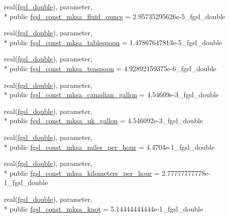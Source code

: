 \begin{DoxyCompactItemize}
\item 
real(\hyperlink{classfgsl_a9af5113378e0f000eb479d3f90196ddf}{fgsl\-\_\-double}), parameter, \\*
public \hyperlink{classfgsl_af688bbef5ebab7dfd674fad9cf5d8bd3}{fgsl\-\_\-const\-\_\-mksa\-\_\-fluid\-\_\-ounce} = 2.\-95735295626e-\/5\-\_\-fgsl\-\_\-double
\item 
real(\hyperlink{classfgsl_a9af5113378e0f000eb479d3f90196ddf}{fgsl\-\_\-double}), parameter, \\*
public \hyperlink{classfgsl_abb32761f02e5a238d65d6c3e48c1c2b9}{fgsl\-\_\-const\-\_\-mksa\-\_\-tablespoon} = 1.\-47867647813e-\/5\-\_\-fgsl\-\_\-double
\item 
real(\hyperlink{classfgsl_a9af5113378e0f000eb479d3f90196ddf}{fgsl\-\_\-double}), parameter, \\*
public \hyperlink{classfgsl_aa58032e706375dbeb56727446a0ffea1}{fgsl\-\_\-const\-\_\-mksa\-\_\-teaspoon} = 4.\-92892159375e-\/6\-\_\-fgsl\-\_\-double
\item 
real(\hyperlink{classfgsl_a9af5113378e0f000eb479d3f90196ddf}{fgsl\-\_\-double}), parameter, \\*
public \hyperlink{classfgsl_a12f46f464315290d696dc0dd7d011aaf}{fgsl\-\_\-const\-\_\-mksa\-\_\-canadian\-\_\-gallon} = 4.\-54609e-\/3\-\_\-fgsl\-\_\-double
\item 
real(\hyperlink{classfgsl_a9af5113378e0f000eb479d3f90196ddf}{fgsl\-\_\-double}), parameter, \\*
public \hyperlink{classfgsl_a15754665dbe5dc6a4976466a653b27a3}{fgsl\-\_\-const\-\_\-mksa\-\_\-uk\-\_\-gallon} = 4.\-546092e-\/3\-\_\-fgsl\-\_\-double
\item 
real(\hyperlink{classfgsl_a9af5113378e0f000eb479d3f90196ddf}{fgsl\-\_\-double}), parameter, \\*
public \hyperlink{classfgsl_a66a4e29fec2be328384363b6a5b3efcd}{fgsl\-\_\-const\-\_\-mksa\-\_\-miles\-\_\-per\-\_\-hour} = 4.\-4704e-\/1\-\_\-fgsl\-\_\-double
\item 
real(\hyperlink{classfgsl_a9af5113378e0f000eb479d3f90196ddf}{fgsl\-\_\-double}), parameter, \\*
public \hyperlink{classfgsl_ae0c1239a6941272700558b0eaf053137}{fgsl\-\_\-const\-\_\-mksa\-\_\-kilometers\-\_\-per\-\_\-hour} = 2.\-77777777778e-\/1\-\_\-fgsl\-\_\-double
\item 
real(\hyperlink{classfgsl_a9af5113378e0f000eb479d3f90196ddf}{fgsl\-\_\-double}), parameter, \\*
public \hyperlink{classfgsl_a36e83219d4dc03eaba28ee2ee6636c56}{fgsl\-\_\-const\-\_\-mksa\-\_\-knot} = 5.\-14444444444e-\/1\-\_\-fgsl\-\_\-double

\end{DoxyCompactItemize}
